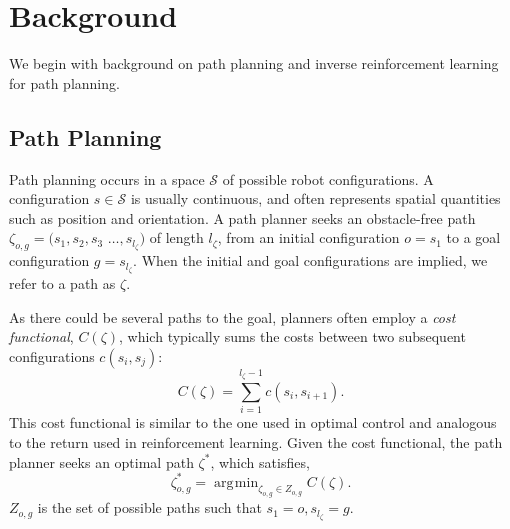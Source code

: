 \documentclass{article}  %
\DeclareMathOperator*{\argmin}{\arg\!\min}
\begin{document}



\section{Background}
We begin with background on path planning and inverse reinforcement learning for path planning.

\subsection{Path Planning \label{subsec:path_planning}}
Path planning occurs in a space $\mathcal{S}$ of possible robot configurations. A configuration $s \in \mathcal{S}$ is usually continuous, and often represents spatial quantities such as position and orientation. A path planner seeks an obstacle-free path $\zeta_{o,g} = (s_1,s_2,s_3$ $\ldots,s_{l_{\zeta}}) $ of length $l_{\zeta}$, from an initial configuration $o = s_1$ to a goal configuration  $g =s_{l_{\zeta}}$. When the initial and goal configurations are implied, we refer to a path as $\zeta$.

As there could be several paths to the goal, planners often employ a \emph{cost functional}, $C(\zeta)$, which typically sums the costs between two subsequent configurations $c(s_i,s_j)$:
\begin{equation}
	C(\zeta) = \sum_{i=1}^{l_{\zeta}-1} c(s_i,s_{i+1}).
\end{equation}
This cost functional is similar to the one used in optimal control and analogous to the return used in reinforcement learning. Given the cost functional, the path planner seeks an optimal path $\zeta^*$, which satisfies,
\begin{equation}
 	\zeta^*_{o,g} = \argmin_{\zeta_{o,g} \in Z_{o,g}} C(\zeta). \label{eq:back_plan}
\end{equation}
$Z_{o,g}$ is the set of possible paths such that $s_1 = o, s_{l_\zeta} = g$.
\end{document}
